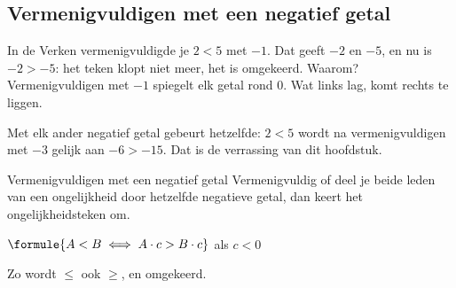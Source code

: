 
\begin{oefeningen}
\end{oefeningen}

\subsection{Vermenigvuldigen met een negatief getal}

In de Verken vermenigvuldigde je $2 < 5$ met $-1$. Dat geeft $-2$ en $-5$, en nu is $-2 > -5$: het teken klopt niet meer, het is omgekeerd. Waarom? Vermenigvuldigen met $-1$ spiegelt elk getal rond 0. Wat links lag, komt rechts te liggen.


Met elk ander negatief getal gebeurt hetzelfde: $2 < 5$ wordt na vermenigvuldigen met $-3$ gelijk aan $-6 > -15$. Dat is de verrassing van dit hoofdstuk.

\begin{theorie}
\begin{stelling}{Vermenigvuldigen met een negatief getal}
Vermenigvuldig of deel je beide leden van een ongelijkheid door hetzelfde negatieve getal, dan keert het ongelijkheidsteken om.

\vspace{1mm}
\qquad $\formule{A < B \iff A \cdot c > B \cdot c}$ \qquad als $c < 0$
\end{stelling}
Zo wordt $\leqslant$ ook $\geqslant$, en omgekeerd.
\end{theorie}

